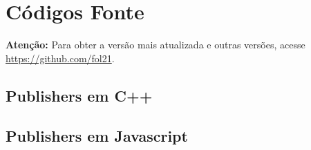 \section{Códigos Fonte}
\label{section:codigos_fonte}

\textbf{Atenção:} Para obter a versão mais atualizada e outras versões, acesse \url{https://github.com/fol21}.

\subsection{Publishers em C++}
\label{subsection:publishers_cpp}












\subsection{Publishers em Javascript}
\label{subsection:publishers_javascript}








